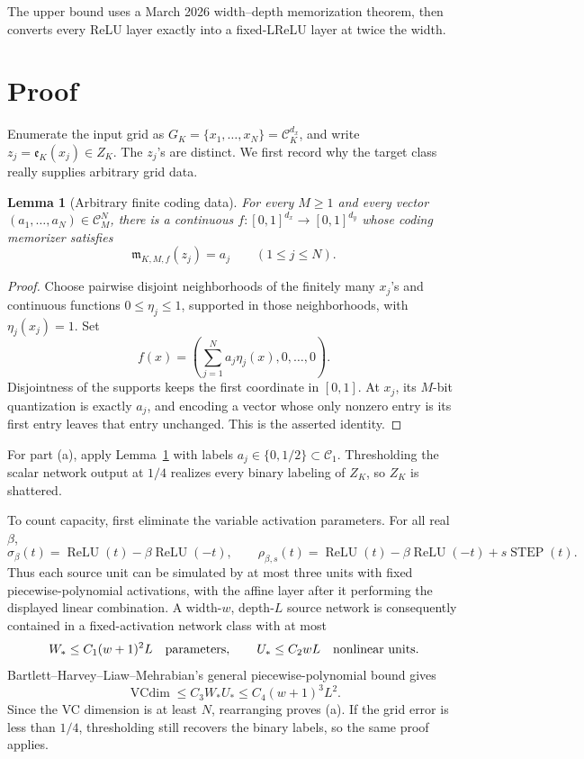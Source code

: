 \documentclass[10pt]{article}
\newtheorem{lemma}[theorem]{Lemma}
\newcommand{\C}{\mathcal C}
\newcommand{\relu}{\operatorname{ReLU}}
\newcommand{\step}{\operatorname{STEP}}
\begin{document}
The upper bound uses a March 2026 width--depth memorization theorem, then
converts every ReLU layer exactly into a fixed-LReLU layer at twice the width.

\section*{Proof}

Enumerate the input grid as $G_K=\{x_1,\ldots,x_N\}=\C_K^{d_x}$, and
write $z_j=\mathfrak e_K(x_j)\in Z_K$.  The $z_j$'s are distinct.
We first record why the target class really supplies arbitrary grid data.

\begin{lemma}[Arbitrary finite coding data]
\label{lem:data}
For every $M\ge1$ and every vector
\((a_1,\ldots,a_N)\in\C_M^N\), there is a continuous
\(f:[0,1]^{d_x}\to[0,1]^{d_y}\) whose coding memorizer satisfies
\[
       \mathfrak m_{K,M,f}(z_j)=a_j\qquad(1\le j\le N).
\]
\end{lemma}

\begin{proof}
Choose pairwise disjoint neighborhoods of the finitely many $x_j$'s and
continuous functions $0\le\eta_j\le1$, supported in those neighborhoods,
with \(\eta_j(x_j)=1\).  Set
\[
 f(x)=\left(\sum_{j=1}^N a_j\eta_j(x),0,\ldots,0\right).
\]
Disjointness of the supports keeps the first coordinate in $[0,1]$.
At $x_j$, its $M$-bit quantization is exactly $a_j$, and encoding a
vector whose only nonzero entry is its first entry leaves that entry
unchanged.  This is the asserted identity.
\end{proof}

For part (a), apply Lemma~\ref{lem:data} with labels
\(a_j\in\{0,1/2\}\subset\C_1\).  Thresholding the scalar network output at
$1/4$ realizes every binary labeling of $Z_K$, so $Z_K$ is shattered.

To count capacity, first eliminate the variable activation parameters.  For
all real \(\beta\),
\[
 \sigma_\beta(t)=\relu(t)-\beta\relu(-t),
 \qquad
 \rho_{\beta,s}(t)=\relu(t)-\beta\relu(-t)+s\step(t).
\]
Thus each source unit can be simulated by at most three units with fixed
piecewise-polynomial activations, with the affine layer after it performing
the displayed linear combination.  A width-$w$, depth-$L$ source network
is consequently contained in a fixed-activation network class with at most
\[
       W_*\le C_1(w+1)^2L \quad\hbox{parameters},\qquad
       U_*\le C_2wL \quad\hbox{nonlinear units}.
\]
Bartlett--Harvey--Liaw--Mehrabian's general piecewise-polynomial bound
\cite[Theorem 8]{BHLM} gives
\[
 \operatorname{VCdim}\le C_3W_*U_*\le C_4(w+1)^3L^2.
\]
Since the VC dimension is at least $N$, rearranging proves (a).  If the
grid error is less than $1/4$, thresholding still recovers the binary
labels, so the same proof applies.
\end{document}
